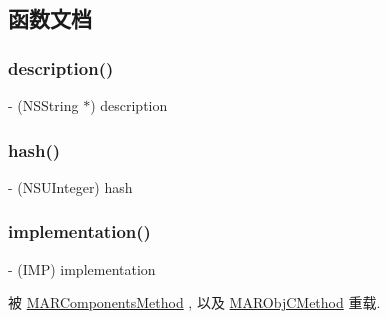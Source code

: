 \subsection{函数文档}
\mbox{\label{interface_m_a_r_method_a7444b859438c35fb61eea3c6e43ec0aa}} 
\subsubsection{\texorpdfstring{description()}{description()}}
{\footnotesize\ttfamily -\/ (N\+S\+String $\ast$) description \begin{DoxyParamCaption}{ }\end{DoxyParamCaption}\hspace{0.3cm}{\ttfamily [implementation]}}

\mbox{\label{interface_m_a_r_method_af5182ffd18f37fce598b274d6f6d8247}} 
\subsubsection{\texorpdfstring{hash()}{hash()}}
{\footnotesize\ttfamily -\/ (N\+S\+U\+Integer) hash \begin{DoxyParamCaption}{ }\end{DoxyParamCaption}\hspace{0.3cm}{\ttfamily [implementation]}}

\mbox{\label{interface_m_a_r_method_a64b5a4d139de5b478d368fa532f981c7}} 
\subsubsection{\texorpdfstring{implementation()}{implementation()}}
{\footnotesize\ttfamily -\/ (I\+MP) implementation \begin{DoxyParamCaption}{ }\end{DoxyParamCaption}}



被 \hyperlink{interface_m_a_r_components_method_af64dff38676e16327468cf8fdfb8b40f}{M\+A\+R\+Components\+Method} , 以及 \hyperlink{interface_m_a_r_obj_c_method_af57e7f0e2f9a6fee8f2e5d3e279c8ab7}{M\+A\+R\+Obj\+C\+Method} 重载.

